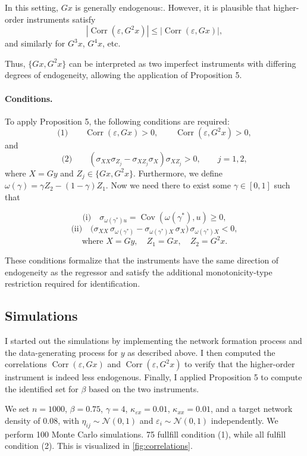 \documentclass[12pt]{article}
\begin{document}
In this setting, $Gx$ is generally endogenous:. However, it is plausible that higher-order instruments satisfy
\[
|\operatorname{Corr}(\varepsilon, G^2 x)| 
\le 
|\operatorname{Corr}(\varepsilon, Gx)|,
\]
and similarly for $G^3 x$, $G^4 x$, etc.

Thus, $\{Gx, G^2 x\}$ can be interpreted as two imperfect instruments with differing degrees of endogeneity, allowing the application of Proposition 5.

\paragraph{Conditions.}
To apply Proposition 5, the following conditions are required:
\[
\text{(1)} \qquad \operatorname{Corr}(\varepsilon, Gx) > 0,
\qquad
\operatorname{Corr}(\varepsilon, G^2 x) > 0,
\]
and
\[
\text{(2)} \qquad  \left(
\sigma_{XX} \sigma_{Z_j}
-
\sigma_{XZ_j} \sigma_X
\right)
\sigma_{XZ_j}
> 0,
\qquad j = 1,2,
\]
where $X = Gy$ and $Z_j \in \{Gx, G^2 x\}$. Furthermore, we define $\omega(\gamma) =\gamma Z_2 - (1-\gamma) Z_1$. Now we need there to exist some $\gamma \in [0,1]$ such that

\[
\text{(i)} \quad
\sigma_{\omega(\gamma^*) u}
=
\operatorname{Cov}(\omega(\gamma^*), u)
\ge 0,
\]
\[
\text{(ii)} \quad
\bigl(
\sigma_{XX} \, \sigma_{\omega(\gamma^*)}
-
\sigma_{\omega(\gamma^*)X} \, \sigma_X
\bigr)
\,
\sigma_{\omega(\gamma^*)X}
< 0,
\]
\[
\text{where } X = Gy, \quad Z_1 = Gx, \quad Z_2 = G^2 x.
\]

These conditions formalize that the instruments have the same direction of endogeneity as the regressor and satisfy the additional monotonicity-type restriction required for identification.

\subsection{Simulations}

I started out the simulations by implementing the network formation process and the data-generating process for $y$ as described above. I then computed the correlations $\operatorname{Corr}(\varepsilon, Gx)$ and $\operatorname{Corr}(\varepsilon, G^2 x)$ to verify that the higher-order instrument is indeed less endogenous. Finally, I applied Proposition 5 to compute the identified set for $\beta$ based on the two instruments.

We set $n = 1000$, $\beta = 0.75$, $\gamma = 4$, $\kappa_{\varepsilon x} = 0.01$, $\kappa_{xx} = 0.01$, and a target network density of $0.08$, with $\eta_{ij} \sim \mathcal{N}(0,1)$ and $\varepsilon_i \sim \mathcal{N}(0,1)$ independently. We perform 100 Monte Carlo simulations. 75 fullfill condition (1), while all fulfill condition (2). This is visualized in \autoref{fig:correlations}.
\end{document}

